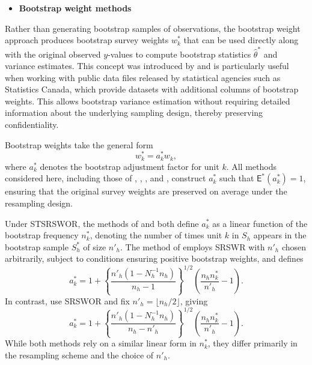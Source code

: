 \begin{itemize}
\tightlist
\item
  \textbf{Bootstrap weight methods}
\end{itemize}

\noindent Rather than generating bootstrap samples of observations, the bootstrap weight approach produces bootstrap survey weights \(w_k^*\) that can be used directly along with the original observed \(y\)-values to compute bootstrap statistics \(\hat\theta^*\) and variance estimates. This concept was introduced by \citet{Rao:Wu:Yue:1992} and is particularly useful when working with public data files released by statistical agencies such as Statistics Canada, which provide datasets with additional columns of bootstrap weights. This allows bootstrap variance estimation without requiring detailed information about the underlying sampling design, thereby preserving confidentiality.

Bootstrap weights take the general form
\[
    w_k^* = a_k^* w_k,
\]
where \(a_k^*\) denotes the bootstrap adjustment factor for unit \(k\). All methods considered here, including those of \citet{Rao:Wu:Yue:1992}, \citet{Chipperfield:Preston:2007}, \citet{Beaumont:Patak:2012}, and \citet{Bertail:Combris:1997}, construct \(a_k^*\) such that \(\mathsf{E}^*(a_k^*) = 1\), ensuring that the original survey weights are preserved on average under the resampling design.

Under STSRSWOR, the methods of \citet{Rao:Wu:Yue:1992} and \citet{Chipperfield:Preston:2007} both define \(a_k^*\) as a linear function of the bootstrap frequency \(n_k^*\), denoting the number of times unit \(k\) in \(\textrm{$S$}_h\) appears in the bootstrap sample \(\textrm{$S$}_h^*\) of size \(n'_h\). The method of \citet{Rao:Wu:Yue:1992} employs SRSWR with \(n'_h\) chosen arbitrarily, subject to conditions ensuring positive bootstrap weights, and defines
\[
    a_k^* = 1 + \left\{\frac{n'_h(1 - N_h^{-1} n_h)}{n_h - 1}\right\}^{1/2} \left(\frac{n_h n_k^*}{n'_h} - 1\right).
\]
In contrast, \citet{Chipperfield:Preston:2007} use SRSWOR and fix \(n'_h = \lfloor n_h/2 \rfloor\), giving
\[
    a_k^* = 1 + \left\{\frac{n'_h(1 - N_h^{-1} n_h)}{n_h - n'_h} \right\}^{1/2} \left(\frac{n_h n_k^*}{n'_h} - 1\right).
\]
While both methods rely on a similar linear form in \(n_k^*\), they differ primarily in the resampling scheme and the choice of \(n'_h\).

